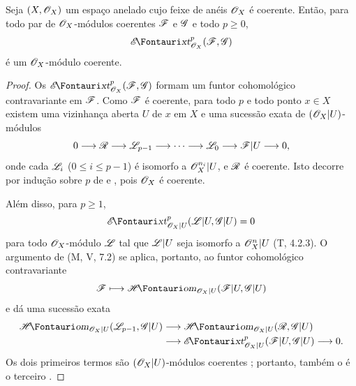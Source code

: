 \begin{proposition}[12.3.3]
\label{0.12.3.3}
Seja $(X,\mathscr{O}_X)$ um espaço anelado cujo feixe de anéis
$\mathscr{O}_X$ é coerente.
Então, para todo par de $\mathscr{O}_X$-módulos coerentes $\mathscr{F}$ e
$\mathscr{G}$ e todo $p\geq0$,
\[
  \shExt^p_{\sh{O}_X}(\sh{F},\sh{G})
\]
é um $\mathscr{O}_X$-módulo coerente.
\end{proposition}

\begin{proof}
Os $\shExt^p_{\sh{O}_X}(\sh{F},\sh{G})$ formam um funtor cohomológico
contravariante em $\mathscr{F}$.
Como $\mathscr{F}$ é coerente, para todo $p$ e todo ponto $x\in X$
existem uma vizinhança aberta $U$ de $x$ em $X$ e uma sucessão exata
de $(\mathscr{O}_X|U)$-módulos
\[
  0\longrightarrow\mathscr{R}\longrightarrow\mathscr{L}_{p-1}
  \longrightarrow\cdots\longrightarrow\mathscr{L}_0
  \longrightarrow\mathscr{F}|U\longrightarrow0,
\]
onde cada $\mathscr{L}_i$ ($0\leq i\leq p-1$) é isomorfo a
$\mathscr{O}_X^{n_i}|U$, e $\mathscr{R}$ é coerente.
Isto decorre por indução sobre $p$ de
 e
, pois $\mathscr{O}_X$ é coerente.

Além disso, para $p\geq1$,
\[
  \shExt^p_{\sh{O}_X|U}(\sh{L}|U,\sh{G}|U)=0
\]
para todo $\mathscr{O}_X$-módulo $\mathscr{L}$ tal que $\mathscr{L}|U$ seja
isomorfo a $\mathscr{O}_X^n|U$ (T, 4.2.3).
O argumento de (M, V, 7.2) se aplica, portanto, ao funtor cohomológico
contravariante
\[
  \sh{F}\longmapsto
  \shHom_{\sh{O}_X|U}(\sh{F}|U,\sh{G}|U)
\]
e dá uma sucessão exata
\[
  \begin{aligned}
  \shHom_{\sh{O}_X|U}(\sh{L}_{p-1},\sh{G}|U)
  &\longrightarrow
  \shHom_{\sh{O}_X|U}(\sh{R},\sh{G}|U)\\
  &\longrightarrow
  \shExt^p_{\sh{O}_X|U}(\sh{F}|U,\sh{G}|U)
  \longrightarrow0.
  \end{aligned}
\]
Os dois primeiros termos são $(\mathscr{O}_X|U)$-módulos coerentes
; portanto, também o é o terceiro
.
\end{proof}

